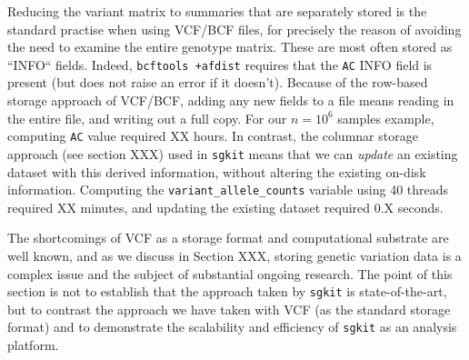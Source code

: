 \documentclass[a4paper,num-refs]{oup-contemporary}
\newcommand{\toolname}[1]{\texttt{#1}}
\begin{document}
Reducing the variant matrix to summaries that are separately stored
is the standard practise when using VCF/BCF files, for precisely the
reason of avoiding the need to examine the entire genotype matrix.
These are most often stored as ``INFO`` fields.
Indeed, \toolname{bcftools +afdist} requires that the \texttt{AC}
INFO field is present (but does not raise an error
if it doesn't). Because of the row-based storage approach of
VCF/BCF, adding any new fields to a file means reading in the entire
file, and writing out a full copy. For our $n=10^6$ samples example,
computing \texttt{AC} value required XX hours.
In contrast, the columnar storage approach (see section XXX) used
in \toolname{sgkit} means that we can \emph{update} an existing
dataset with this derived information, without altering the existing
on-disk information.
Computing the
\texttt{variant\_allele\_counts} variable using
40 threads  required XX minutes, and updating the existing dataset required
0.X seconds.

The shortcomings of VCF as a storage format and computational
substrate are well known, and as we discuss in Section XXX,
storing genetic variation data is a complex issue
and the subject of substantial ongoing research. The point of this
section is not to establish that the approach taken by \toolname{sgkit}
is state-of-the-art, but to contrast the approach we have taken
with VCF (as the standard storage format) and to demonstrate
the scalability and efficiency of \toolname{sgkit} as an analysis
platform.
\end{document}

